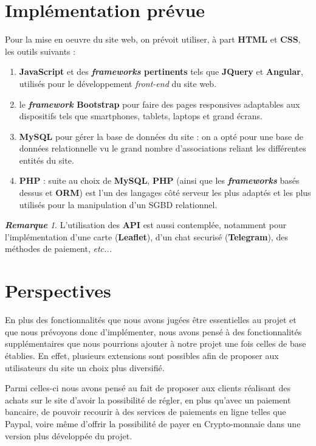 \documentclass[a4paper,12pt]{book}
\theoremstyle{break}
\theoremstyle{break}
\theoremstyle{break}
\theoremstyle{break}
\theoremstyle{definition}
\theoremstyle{remark}
\newtheorem*{remark}{\textbf{Remarque}}
\begin{document}
\section{Implémentation prévue}
Pour la mise en oeuvre du site web, on prévoit utiliser, à part \textbf{HTML} et \textbf{CSS}, les outils suivants :
\begin{enumerate}
  \item{\textbf{JavaScript} et des \textbf{\textit{frameworks} pertinents} tels que \textbf{JQuery} et \textbf{Angular}, utilisés pour le développement \textit{front-end} du site web.}
  \item{le \textbf{\textit{framework} Bootstrap} pour faire des pages responsives adaptables aux dispositifs tels que smartphones, tablets, laptops et grand écrans.}
  \item{\textbf{MySQL} pour gérer la base de données du site : on a opté pour une base de données relationnelle vu le grand nombre d'associations reliant les différentes entités du site.}
  \item{\textbf{PHP} : suite au choix de \textbf{MySQL}, \textbf{PHP} (ainsi que les \textbf{\textit{frameworks}} basés dessus et \textbf{ORM}) est l'un des langages côté serveur les plus adaptés et les plus utilisés pour la manipulation d'un SGBD relationnel.}
\end{enumerate}

\begin{remark}
L'utilisation des \textbf{API} est aussi contemplée, notamment pour l'implémentation d'une carte (\textbf{Leaflet}), d'un chat securisé (\textbf{Telegram}), des méthodes de paiement, \textit{etc...}
\end{remark}
\section{Perspectives}
\label{sec:perspectives}
En plus des fonctionnalités que nous avons jugées être essentielles au projet et que nous prévoyons donc d'implémenter, nous avons pensé à des fonctionnalités supplémentaires que nous pourrions ajouter à notre projet une fois celles de base établies. En effet, plusieurs extensions sont possibles afin de proposer aux utilisateurs du site un choix plus diversifié.

Parmi celles-ci nous avons pensé au fait de proposer aux clients réalisant des achats sur le site d'avoir la possibilité de régler, en plus qu'avec un paiement bancaire, de pouvoir recourir à des services de paiements en ligne telles que Paypal, voire même d'offrir la possibilité de payer en Crypto-monnaie dans une version plus développée du projet.
\end{document}
